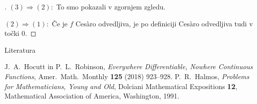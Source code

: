\documentclass[10]{beamer}
\newenvironment{dokaz}{\begin{proof}[\bfseries\upshape\proofname]}{\end{proof}}
\begin{document}
\begin{frame}
    \begin{dokaz}
        $(3) \Rightarrow (2): $ To smo pokazali v zgornjem zgledu.
        \pause

        \medskip
        $(2) \Rightarrow (1): $ Če je $f$ Ces\`{a}ro odvedljiva, je po definiciji Ces\`{a}ro odvedljiva tudi v točki $0$.
    \end{dokaz}
\end{frame}

\begin{frame}{Literatura}
    \begin{thebibliography}{1}
        J.~A.~Hocutt in P.~L.~Robinson, \emph{Everywhere Differentiable, Nowhere Continuous Functions}, Amer.~Math.~Monthly \textbf{125} (2018) 923--928.
        P.~R.~Halmos, \emph{Problems for Mathematicians, Young and Old}, Dolciani Mathematical Expositions \textbf{12}, Mathematical Association of America, Washington, 1991.
    \end{thebibliography}
\end{frame}
\end{document}
